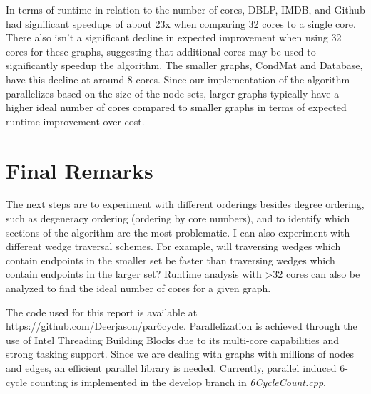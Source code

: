 \documentclass[11pt]{article}
\begin{document}
In terms of runtime in relation to the number of cores, DBLP, IMDB, and Github had significant speedups of about 23x when comparing 32 cores to a single core.
There also isn't a significant decline in expected improvement when using 32 cores for these graphs, suggesting that additional cores may be used to significantly speedup the algorithm.
The smaller graphs, CondMat and Database, have this decline at around 8 cores.
Since our implementation of the algorithm parallelizes based on the size of the node sets, larger graphs typically have a higher ideal number of cores compared to smaller graphs in terms of expected runtime improvement over cost.

\section {Final Remarks}

The next steps are to experiment with different orderings besides degree ordering, such as degeneracy ordering (ordering by core numbers), and to identify which sections of the algorithm are the most problematic.
I can also experiment with different wedge traversal schemes.
For example, will traversing wedges which contain endpoints in the smaller set be faster than traversing wedges which contain endpoints in the larger set?
Runtime analysis with >32 cores can also be analyzed to find the ideal number of cores for a given graph.

The code used for this report is available at https://github.com/Deerjason/par6cycle.
Parallelization is achieved through the use of Intel Threading Building Blocks due to its multi-core capabilities and strong tasking support.
Since we are dealing with graphs with millions of nodes and edges, an efficient parallel library is needed.
Currently, parallel induced 6-cycle counting is implemented in the develop branch in \textit{6CycleCount.cpp}.

{}

\end{document}
